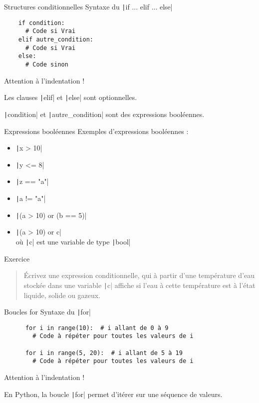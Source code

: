 \documentclass[10pt]{beamer}
\begin{document}
\begin{frame}[fragile]{Structures conditionnelles}  
  Syntaxe du \texttt|if ... elif ... else|
  \begin{beamercodeblock}
    \begin{verbatim}
    if condition:
      # Code si Vrai
    elif autre_condition:
      # Code si Vrai
    else:
      # Code sinon
    \end{verbatim}
  \end{beamercodeblock}
  Attention à \alert{l'indentation} !

  Les clauses \texttt|elif| et \texttt|else| sont optionnelles.

  \texttt|condition| et \texttt|autre_condition| sont des expressions booléennes.
\end{frame}

\begin{frame}[fragile]{Expressions booléennes}
  Exemples d'expressions booléennes :
  \begin{itemize}
    \item \texttt|x > 10|
    \item \texttt|y <= 8|
    \item \texttt|z == "a"|
    \item \texttt|a != "a"|
    \item \texttt|(a > 10) or (b == 5)|
    \item \texttt|(a > 10) or c| \\ où \texttt|c| est une variable de type \texttt|bool|
  \end{itemize}
\end{frame}

\begin{frame}{Exercice}
  \begin{quote}
    Écrivez une expression conditionnelle, qui à partir d'une température d'eau stockée dans une variable \texttt|c| affiche si l'eau à cette température est à l'état liquide, solide ou gazeux.
  \end{quote}
\end{frame}

\begin{frame}[fragile]{Boucles for}  
  Syntaxe du \texttt|for|
  \begin{beamercodeblock}
    \begin{verbatim}
      for i in range(10):  # i allant de 0 à 9
        # Code à répéter pour toutes les valeurs de i
    
      for i in range(5, 20):  # i allant de 5 à 19
        # Code à répéter pour toutes les valeurs de i
    \end{verbatim}
  \end{beamercodeblock}
  Attention à \alert{l'indentation} !

  En Python, la boucle \texttt|for| permet d'itérer sur \alert{une séquence de valeurs}.
\end{frame}
\end{document}

